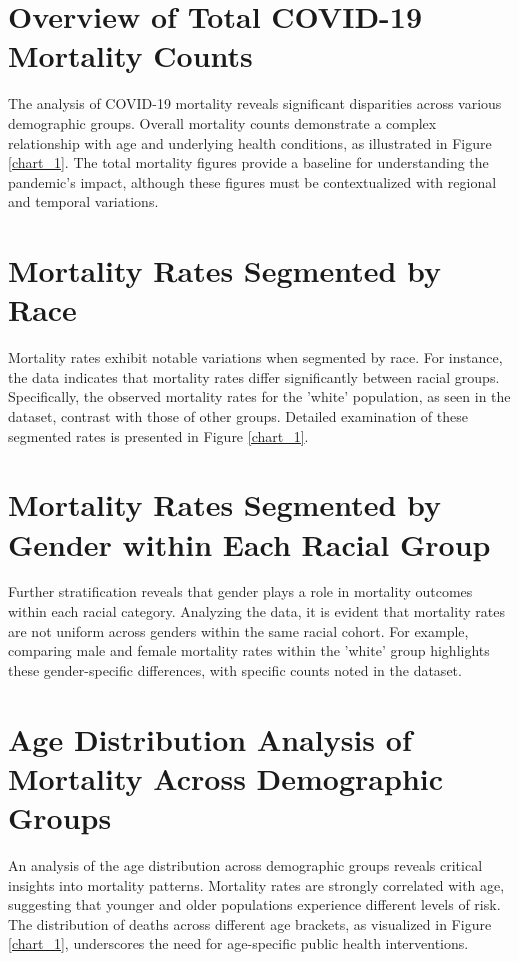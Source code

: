 \section{Overview of Total COVID-19 Mortality Counts}
The analysis of COVID-19 mortality reveals significant disparities across various demographic groups. Overall mortality counts demonstrate a complex relationship with age and underlying health conditions, as illustrated in Figure \ref{chart_1}. The total mortality figures provide a baseline for understanding the pandemic's impact, although these figures must be contextualized with regional and temporal variations.

\section{Mortality Rates Segmented by Race}
Mortality rates exhibit notable variations when segmented by race. For instance, the data indicates that mortality rates differ significantly between racial groups. Specifically, the observed mortality rates for the 'white' population, as seen in the dataset, contrast with those of other groups. Detailed examination of these segmented rates is presented in Figure \ref{chart_1}.

\section{Mortality Rates Segmented by Gender within Each Racial Group}
Further stratification reveals that gender plays a role in mortality outcomes within each racial category. Analyzing the data, it is evident that mortality rates are not uniform across genders within the same racial cohort. For example, comparing male and female mortality rates within the 'white' group highlights these gender-specific differences, with specific counts noted in the dataset.

\section{Age Distribution Analysis of Mortality Across Demographic Groups}
An analysis of the age distribution across demographic groups reveals critical insights into mortality patterns. Mortality rates are strongly correlated with age, suggesting that younger and older populations experience different levels of risk. The distribution of deaths across different age brackets, as visualized in Figure \ref{chart_1}, underscores the need for age-specific public health interventions.